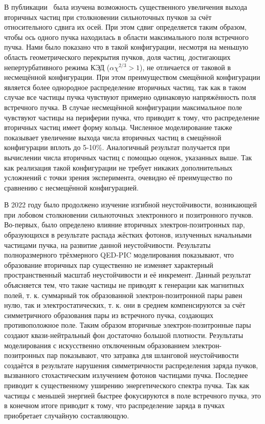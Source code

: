 В публикации~\cite{filipovic2021effect} была изучена возможность существенного увеличения выхода вторичных частиц при столкновении сильноточных пучков за счёт относительного сдвига их осей.
При этом сдвиг определяется таким образом, чтобы ось одного пучка находилась в области максимального поля встречного пучка. Нами было показано что в такой конфигурации, несмотря на меньшую область геометрического перекрытия пучков, доля частиц, достигающих непертурбативного режима КЭД ($\alpha \chi^{2/3} > 1$), не отличается от таковой в несмещённой конфигурации.
При этом преимуществом смещённой конфигурации является более однородное распределение вторичных частиц, так как в таком случае все частицы пучка чувствуют примерно одинаковую напряжённость поля встречного пучка.
В случае несмещённой конфигурации максимальное поле чувствуют частицы на периферии пучка, что приводит к тому, что распределение вторичных частиц имеет форму кольца.
Численное моделирование также показывает увеличение выхода числа вторичных частиц в смещённой конфигурации вплоть до 5-10\%.
Аналогичный результат получается при вычислении числа вторичных частиц с помощью оценок, указанных выше.
Так как реализация такой конфигурации не требует никаких дополнительных усложнений с точки зрения эксперимента, очевидно её преимущество по сравнению с несмещённой конфигурацией.


В 2022 году было продолжено изучение изгибной неустойчивости, возникающей при лобовом столкновении сильноточных электронного и позитронного пучков.
Во-первых, было определено влияние вторичных электрон-позитронных пар, образующихся в результате распада жёстких фотонов, излученных начальными частицами пучка, на развитие данной неустойчивости.
Результаты полноразмерного трёхмерного QED-PIC моделирования показывают, что образование вторичных пар существенно не изменяет характерный пространственный масштаб неустойчивости и её инкремент.
Данный результат объясняется тем, что такие частицы не приводят к генерации как магнитных полей, т. к. суммарный ток образованной электрон-позитронной пары равен нулю, так и электростатических, т. к. они в среднем компенсируются за счёт симметричного образования пары из встречного пучка, создающих противоположное поле.
Таким образом вторичные электрон-позитронные пары создают квази-нейтральный фон достаточно большой плотности.
Результаты моделирования с искусственно отключенным образованием электрон-позитронных пар показывают, что затравка для шланговой неустойчивости создаётся в результате нарушения симметричности распределения заряда пучков, вызванного стохастическим излучением фотонов частицами пучка.
Последнее приводит к существенному уширению энергетического спектра пучка.
Так как частицы с меньшей энергией быстрее фокусируются в поле встречного пучка, это в конечном итоге приводит к тому, что распределение заряда в пучках приобретает случайную составляющую.

